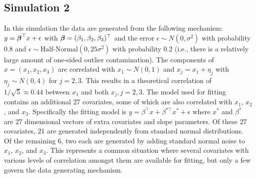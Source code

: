 \documentclass[ba]{imsart}
\def\bbeta{\mbox{\boldmath $\beta$}}
\begin{document}
\subsection{Simulation 2}

In this simulation the data are generated from the following mechanism: $y = \bbeta^{\top}x + \epsilon$
with $\bbeta = (\beta_{1}, \beta_{2},\beta_{3})^{\top}$ and the error $\epsilon \sim N(0,\sigma^{2})$ with probability $0.8$ and $\epsilon \sim \text{Half-Normal}(0,25\sigma^{2})$ with probability $0.2$ (i.e., there is a relatively large amount of one-sided outlier contamination). The components of $x = (x_{1}, x_{2}, x_{3})$ are correlated with $x_1 \sim N(0,1)$ and $x_{j} = x_{1} + \eta_{j}$ with $\eta_{j} \sim N(0, 4)$ for $j = 2,3$. This results in a theoretical correlation of $1/\sqrt{5} \approx 0.44$ between $x_{1}$ and both $x_{j}, j = 2, 3$. The model used for fitting contains an additional 27 covariates, some of which are also correlated with $x_{1}$, $x_{2}$, and $x_{3}$. Specifically the fitting model is $y = \beta^{\top} x + \beta^{*\top} x^{*} + \epsilon$ where $x^{*}$ and $\beta^{*}$ are 27 dimensional vectors of extra covariates and slope parameters. Of these 27 covariates, 21 are generated independently from standard normal distributions. Of the remaining 6, two each are generated by adding standard normal noise to $x_{1}$, $x_{2}$, and $x_{3}$. This represents a common situation where several covariates with various levels of correlation amongst them are available for fitting, but only a few govern the data generating mechanism.
\end{document}
